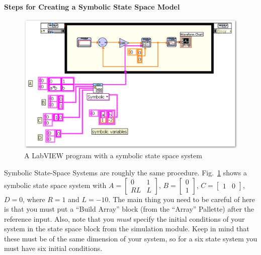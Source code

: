 \newpage
\begin{center} \textbf{Steps for Creating a Symbolic State Space Model}
\end{center}


\begin{figure}[t!]
\centering
\includegraphics[width=6in]{symbolic/symbolicSS}
\caption{A LabVIEW program with a symbolic state space system}
\label{fig-symbolicSS}
\end{figure}


Symbolic State-Space Systems are roughly the same procedure.
Fig.~\ref{fig-symbolicSS} shows a symbolic state space system with
$A=\left[\begin{array}{cc} 0 & 1 \\ RL & L \end{array}\right]$,
$B=\left[\begin{array}{c} 0 \\ 1 \end{array}\right]$, $C=\left[\begin{array}{cc}
    1 & 0 \end{array}\right]$, $D=0$, where $R=1$ and $L=-10$.  The main thing
you need to be careful of here is that you must put a ``Build Array'' block
(from the ``Array'' Pallette)
after the reference input.  Also, note that you \emph{must} specify the initial
conditions of your system in the state space block from the simulation module.
Keep in mind that these must be of the same dimension of your system, so for a
six state system you must have six initial conditions.
 


